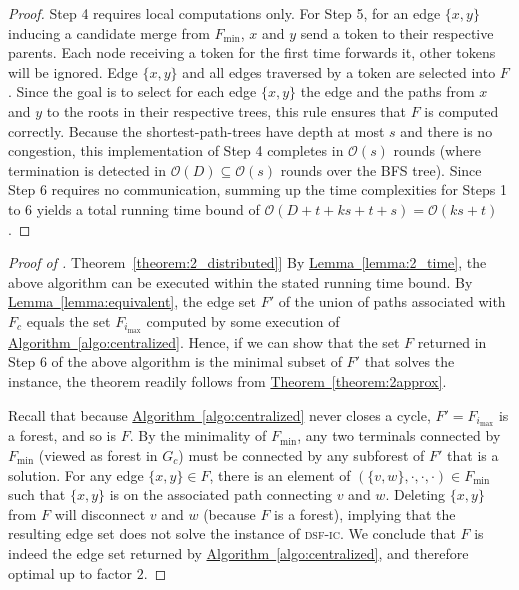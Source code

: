 \documentclass[letterpaper,11pt]{article}
\newcommand{\namedref}[2]{\hyperref[#2]{#1~\ref*{#2}}}
\newcommand{\theoremref}[1]{\namedref{Theorem}{#1}}
\newcommand{\lemmaref}[1]{\namedref{Lemma}{#1}}
\newcommand{\algref}[1]{\namedref{Algorithm}{#1}}
\newcommand{\BO}{\mathcal{O}}
\newcommand{\sfic}{\textsc{dsf-ic}\xspace}
\begin{document}
\begin{proof}
Step 4 requires local computations only. For Step 5, for an edge $\{x,y\}$
inducing a candidate merge from $F_{\min}$, $x$ and $y$ send a token to their
respective parents. Each node receiving a token for the first time forwards it,
other tokens will be ignored. Edge $\{x,y\}$ and all edges traversed by a token
are selected into $F$. Since the goal is to select for each edge $\{x,y\}$ the
edge and the paths from $x$ and $y$ to the roots in their respective trees, this
rule ensures that $F$ is computed correctly. Because the shortest-path-trees
have depth at most $s$ and there is no congestion, this implementation of Step 4
completes in $\BO(s)$ rounds (where termination is detected in
$\BO(D)\subseteq \BO(s)$ rounds over the BFS tree). Since Step 6 requires no
communication, summing up the time complexities for Steps 1 to 6 yields a total
running time bound of $\BO(D+t+ks+t+s)=\BO(ks+t)$.
\end{proof}
\begin{proof}[Proof of \theoremref{theorem:2_distributed}]
By \lemmaref{lemma:2_time}, the above algorithm can be executed within the
stated running time bound. By \lemmaref{lemma:equivalent}, the edge set $F'$ of
the union of paths associated with $F_c$ equals the set $F_{i_{\max}}$
computed by some execution of \algref{algo:centralized}. Hence, if we can show
that the set $F$ returned in Step 6 of the above algorithm is the minimal subset
of $F'$ that solves the instance, the theorem readily follows from
\theoremref{theorem:2approx}.

Recall that because \algref{algo:centralized} never closes a cycle,
$F'=F_{i_{\max}}$ is a forest, and so is $F$. By the minimality of $F_{\min}$,
any two terminals connected by $F_{\min}$ (viewed as forest in $G_c$) must be
connected by any subforest of $F'$ that is a solution. For any edge $\{x,y\}\in
F$, there is an element of $(\{v,w\},\cdot,\cdot,\cdot)\in F_{\min}$ such that
$\{x,y\}$ is on the associated path connecting $v$ and $w$. Deleting $\{x,y\}$
from $F$ will disconnect $v$ and $w$ (because $F$ is a forest), implying that
the resulting edge set does not solve the instance of \sfic. We conclude that
$F$ is indeed the edge set returned by \algref{algo:centralized}, and therefore
optimal up to factor $2$.
\end{proof}
\end{document}
